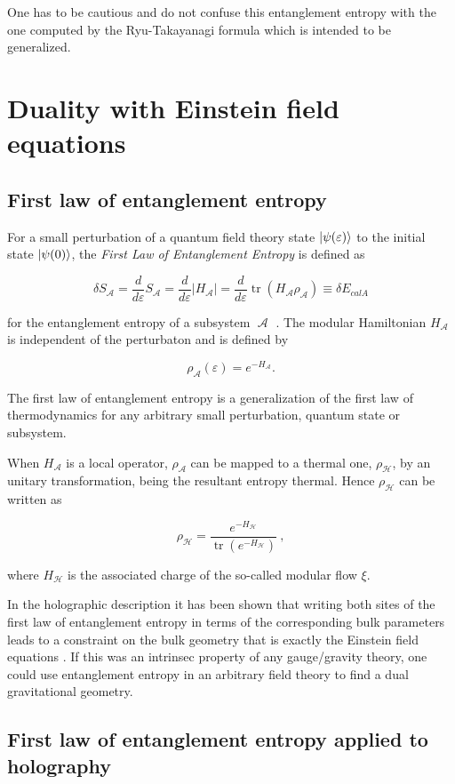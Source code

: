 \documentclass[twocolumn]{revtex4}
\providecommand{\abs}[1]{\lvert#1\rvert}
\providecommand{\eq}[2]{
    \begin{equation}
        #2
    \label{eq:#1}
    \end{equation}
}
\DeclareMathOperator{\calA}{\mathcal{A}}
\DeclareMathOperator{\calH}{\mathcal{H}}
\DeclareMathOperator{\tr}{tr}
\begin{document}
One has to be cautious and do not confuse this entanglement entropy with the one computed by the Ryu-Takayanagi formula which is intended to be generalized.








\section{Duality with Einstein field equations} \label{s:EQ}

\subsection{First law of entanglement entropy} \label{ss:FLEE}

For a small perturbation of a quantum field theory state $\ket{\psi(\varepsilon)}$ to the initial state $\ket{\psi(0)}$, the \textit{First Law of Entanglement Entropy} is defined as
\eq{FLEE}{
    \delta S_{\calA} = \frac{d}{d \varepsilon} S_{\calA} = \frac{d}{d \varepsilon} \abs{H_{\calA}} = \frac{d}{d \varepsilon} \tr (H_{\calA} \rho_{\calA}) \equiv \delta E_{calA}
}
for the entanglement entropy of a subsystem $\calA$ \cite{fareghbal_first_2019}. The modular Hamiltonian $H_{\calA}$ is independent of the perturbaton and is defined by
\eq{modularH}{
    \rho_{\calA} (\varepsilon) = e^{-H_{\calA}}.
}

The first law of entanglement entropy is a generalization of the first law of thermodynamics for any arbitrary small perturbation, quantum state or subsystem.

When $H_{\calA}$ is a local operator, $\rho_{\calA}$ can be mapped to a thermal one, $\rho_{\calH}$, by an unitary transformation, being the resultant entropy thermal. Hence $\rho_{\calH}$ can be written as
\eq{modularH2}{
    \rho_{\calH} = \frac{e^{-H_{\calH}}}{\tr (e^{-H_{\calH}})} \ ,
}
where $H_{\calH}$ is the associated charge of the so-called modular flow $\xi$.

In the holographic description it has been shown that writing both sites of the first law of entanglement entropy in terms of the corresponding bulk parameters leads to a constraint on the bulk geometry that is exactly the Einstein field equations \cite{fareghbal_first_2019}. If this was an intrinsec property of any gauge/gravity theory, one could use entanglement entropy in an arbitrary field theory to find a dual gravitational geometry.

\subsection{First law of entanglement entropy applied to holography} \label{ss:FLEE_H}
\end{document}
